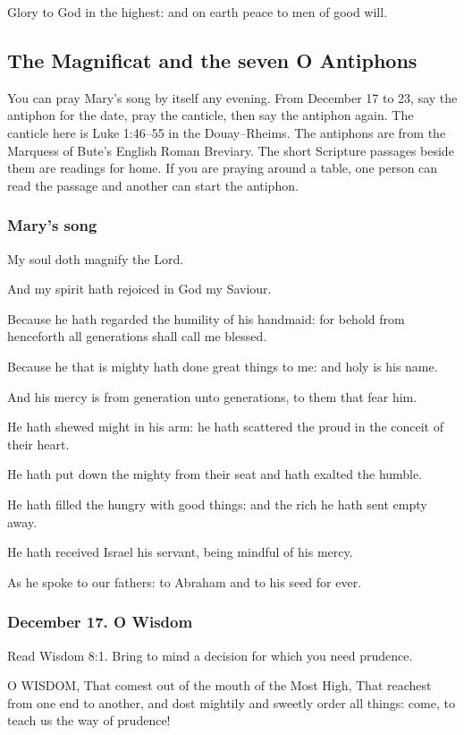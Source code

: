 Glory to God in the highest: and on earth peace to men of good will.

\subsection{The Magnificat and the seven O Antiphons}
\label{sec:advent-evenings}

You can pray Mary's song by itself any evening. From December 17 to 23,
say the antiphon for the date, pray the canticle, then say the antiphon
again. The canticle here is Luke 1:46--55 in the Douay--Rheims. The
antiphons are from the Marquess of Bute's English Roman Breviary.
The short Scripture passages beside them are readings for home. If you
are praying around a table, one person can read the passage and another
can start the antiphon.

\subsubsection*{Mary's song}

My soul doth magnify the Lord.

And my spirit hath rejoiced in God my Saviour.

Because he hath regarded the humility of his handmaid: for behold from henceforth all generations shall call me blessed.

Because he that is mighty hath done great things to me: and holy is his name.

And his mercy is from generation unto generations, to them that fear him.

He hath shewed might in his arm: he hath scattered the proud in the conceit of their heart.

He hath put down the mighty from their seat and hath exalted the humble.

He hath filled the hungry with good things: and the rich he hath sent empty away.

He hath received Israel his servant, being mindful of his mercy.

As he spoke to our fathers: to Abraham and to his seed for ever.

\subsubsection*{December 17. O Wisdom}

Read Wisdom 8:1. Bring to mind a decision for which you need prudence.

O WISDOM, That comest out of the mouth of the Most High, That reachest from one end to another, and dost mightily and sweetly order all things: come, to teach us the way of prudence!

